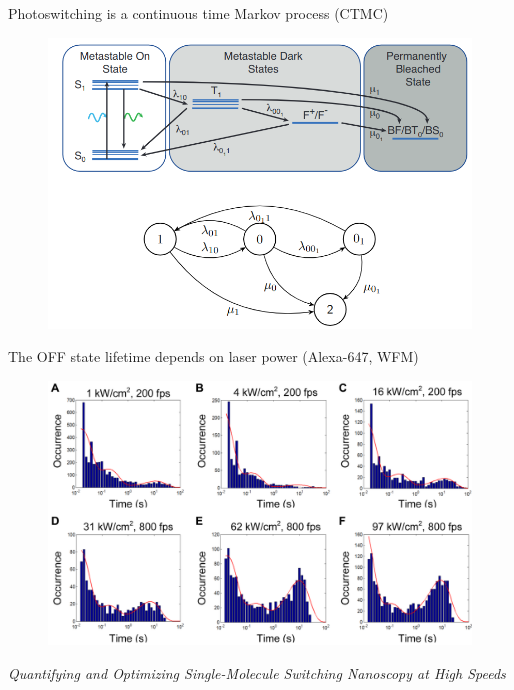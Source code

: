 \documentclass[aspectratio=169]{beamer}
\begin{document}
\begin{frame}{Photoswitching is a continuous time Markov process (CTMC)}

\begin{figure}
\includegraphics[scale=0.325]{Figure-2}
\end{figure}

\end{frame}

\begin{frame}{The OFF state lifetime depends on laser power (Alexa-647, WFM)}

\begin{figure}
\includegraphics[scale=0.2]{Figure-4}
\end{figure}
\textit{Quantifying and Optimizing Single-Molecule Switching Nanoscopy at High Speeds}
\end{frame}
\end{document}
